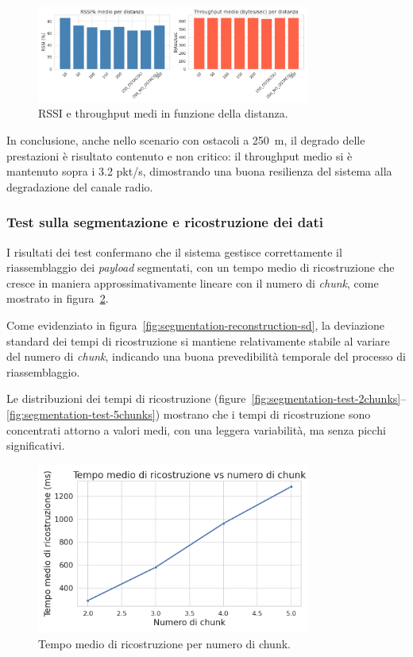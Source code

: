 \documentclass[12pt,a4paper,twoside]{book}
\begin{document}
\begin{figure}[H]
    \centering
    \includegraphics[width=0.8\textwidth]{img/tests/T1/T1-rssi_throughput_col.png}
    \caption{RSSI e throughput medi in funzione della distanza.}
    \label{fig:RSSI-throughput-dist}
\end{figure}

In conclusione, anche nello scenario con ostacoli a 250~m, il degrado delle prestazioni
è risultato contenuto e non critico: il throughput medio si è mantenuto sopra i
3.2 pkt/s, dimostrando una buona resilienza del sistema alla degradazione del canale radio.

\subsubsection{Test sulla segmentazione e ricostruzione dei dati}
I risultati dei test confermano che il sistema gestisce correttamente il riassemblaggio
dei \emph{payload} segmentati, con un tempo medio di ricostruzione che cresce in
maniera approssimativamente lineare con il numero di \emph{chunk}, come mostrato
in figura~\ref{fig:segmentation-reconstruction-avg-time}.

Come evidenziato in figura~\ref{fig:segmentation-reconstruction-sd}, la deviazione standard
dei tempi di ricostruzione si mantiene relativamente stabile al variare del numero di \emph{chunk},
indicando una buona prevedibilità temporale del processo di riassemblaggio.

Le distribuzioni dei tempi di ricostruzione (figure~\ref{fig:segmentation-test-2chunks}–\ref{fig:segmentation-test-5chunks})
mostrano che i tempi di ricostruzione sono concentrati attorno a valori medi, con una
leggera variabilità, ma senza picchi significativi.
\vspace{1cm}
\begin{figure}[H]
    \centering
    \centering
    \includegraphics[width=0.8\textwidth]{img/tests/T2/T2-avg-time.png}
    \caption{Tempo medio di ricostruzione per numero di chunk.}
    \label{fig:segmentation-reconstruction-avg-time}
\end{figure}
\end{document}

